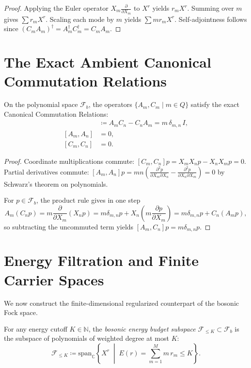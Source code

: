 \begin{proof}
Applying the Euler operator $X_m \frac{\partial}{\partial X_m}$ to $X^r$ yields $r_m X^r$. Summing over $m$ gives $\sum r_m X^r$. Scaling each mode by $m$ yields $\sum m r_m X^r$. Self-adjointness follows since $(C_m A_m)^\dagger = A_m^\dagger C_m^\dagger = C_m A_m$.
\end{proof}

\section{The Exact Ambient Canonical Commutation Relations}

\begin{theorem}
\label{thm:exact_ccr}
On the polynomial space $\mathcal{F}_b$, the operators $\{A_m, C_m \mid m \in Q\}$ satisfy the exact Canonical Commutation Relations:
\begin{align}
[A_m, C_n] &\coloneqq A_m C_n - C_n A_m = m\, \delta_{m, n}\, I, \label{eq:boson_ccr} \\
[A_m, A_n] &= 0, \\
[C_m, C_n] &= 0.
\end{align}
\end{theorem}

\begin{proof}
Coordinate multiplications commute: $[C_m, C_n] p = X_m X_n p - X_n X_m p = 0$.
Partial derivatives commute: $[A_m, A_n] p = m n \left(\frac{\partial^2 p}{\partial X_m \partial X_n} - \frac{\partial^2 p}{\partial X_n \partial X_m}\right) = 0$ by Schwarz's theorem on polynomials.

For $p\in\mathcal F_b$, the product rule gives in one step
\begin{equation}
A_m(C_n p)=m\frac{\partial}{\partial X_m}(X_n p)=m\delta_{m,n}p+X_n\left(m\frac{\partial p}{\partial X_m}\right)=m\delta_{m,n}p+C_n(A_m p),
\end{equation}
so subtracting the uncommuted term yields $[A_m,C_n]p=m\delta_{m,n}p$.
\end{proof}

\section{Energy Filtration and Finite Carrier Spaces}

We now construct the finite-dimensional regularized counterpart of the bosonic Fock space.

\begin{definition}
For any energy cutoff $K \in \mathbb{N}$, the \emph{bosonic energy budget subspace} $\mathcal{F}_{\le K} \subset \mathcal{F}_b$ is the subspace of polynomials of weighted degree at most $K$:
\begin{equation}
\mathcal{F}_{\le K} \coloneqq \mathrm{span}_{\mathbb{C}} \left\{ X^r \;\middle|\; E(r) = \sum_{m=1}^M m\, r_m \le K \right\}.
\end{equation}
\end{definition}

